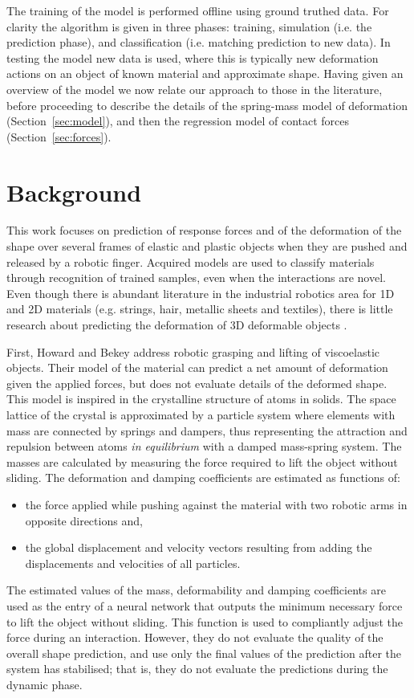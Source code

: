 \documentclass[journal]{IEEEtran}
\newcommand{\alref}[1]{Algorithm~\ref{#1}}
\newcounter{algorithm}
\begin{document}
The training of the model is performed offline using ground truthed data. %
For clarity the algorithm is given in three phases: training, simulation (i.e. the prediction phase), and classification (i.e. matching prediction to new data). In testing the model new data is used, where this is typically new deformation actions on an object of known material and approximate shape. Having given an overview of the model we now relate our approach to those in the literature, before proceeding to describe the details of the spring-mass model of deformation (Section~\ref{sec:model}), and then the regression model of contact forces (Section~\ref{sec:forces}).

\section{Background}
\label{sec:background}
This work focuses on prediction of response forces and of the deformation of the shape over several frames of elastic and plastic objects when they are pushed and released by a robotic finger.  Acquired models are used to classify materials through recognition of trained samples, even when the interactions are novel.  Even though there is abundant literature in the industrial robotics area for 1D and 2D materials (e.g. strings, hair, metallic sheets and textiles), there is little research about predicting the deformation of 3D deformable objects \cite{Khalil2010review}.

First, Howard and Bekey \cite{Howard2000} address robotic grasping and lifting of viscoelastic objects.  Their model of the material can predict a net amount of deformation given the applied forces, but does not evaluate details of the deformed shape.   This model is inspired in the crystalline structure of atoms in solids.  The space lattice of the crystal is approximated by a particle system where elements with mass are connected by springs and dampers, thus representing the attraction and repulsion between atoms \emph{in equilibrium} with a damped mass-spring system.  The masses are calculated by measuring the force required to lift the object without sliding.  The deformation and damping coefficients are estimated as functions of:
\begin{itemize}
 \item the force applied while pushing against the material with two robotic arms in opposite directions and,
 \item the global displacement and velocity vectors resulting from adding the displacements and velocities of all particles.
\end{itemize}
The estimated values of the mass, deformability and damping coefficients are used as the entry of a neural network that outputs the minimum necessary force to lift the object without sliding.  This function is used to compliantly adjust the force during an interaction.  However, they do not evaluate the quality of the overall shape prediction, and use only the final values of the prediction after the system has stabilised; that is, they do not evaluate the predictions during the dynamic phase.
\end{document}
